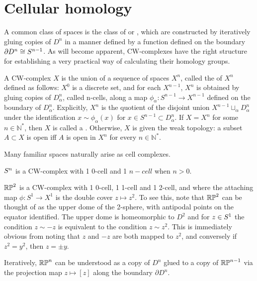 \section{Cellular homology}
A common class of spaces is the class of  or , which are constructed by iteratively gluing copies of $D^n$ in a manner defined by a function defined on the boundary $\partial D^n \iso \S{n-1}$. As will become apparent, CW-complexes have the right structure for establishing a very practical way of calculating their homology groups.

\begin{definition}
A CW-complex $X$ is the union of a sequence of spaces $X^n$, called the  of $X^n$ defined as follows: $X^0$ is a discrete set, and for each $X^{n-1}$, $X^{n}$ is obtained by gluing copies of $D_{\alpha}^n$, called n-cells, along a map $\phi_{\alpha}:S^{n-1}\rightarrow X^{n-1}$ defined on the boundary of $D_{\alpha}^n$. Explicitly, $X^n$ is the quotient of the disjoint union $X^{n-1}\sqcup_{\alpha} D_{\alpha}^n$ under the identification $x\sim \phi_{\alpha}(x)$ for $x\in S^{n-1}\subset D_{\alpha}^n$. If $X=X^n$ for some $n\in \mathbb{N}^*$, then $X$ is called a . Otherwise, $X$ is given the weak topology: a subset $A\subset X$ is open iff $A$ is open in $X^n$ for every $n\in \mathbb{N}^*$.
\end{definition}

Many familiar spaces naturally arise as cell complexes.

\begin{example}
$\S{n}$ is a CW-complex with 1 0-cell and 1 $n-cell$ when $n>0$. 
\end{example}

\begin{example}
$\RP{2}$ is a CW-complex with 1 0-cell, 1 1-cell and 1 2-cell, and where the attaching map $\phi:S^1\rightarrow X^1$ is the double cover $z\mapsto z^2$. To see this, note that $\RP{2}$ can be thought of as the upper dome of the 2-sphere, with antipodal points on the equator identified. The upper dome is homeomorphic to $D^2$ and for $z\in \S{1}$ the condition $z\sim -z$ is equivalent to the condition $z\sim z^2$. This is immediately obvious from noting that $z$ and $-z$ are both mapped to $z^2$, and conversely if $z^2=y^2$, then $z=\pm y$.

Iteratively, $\RP{n}$ can be understood as a copy of $D^n$ glued to a copy of $\RP{n-1}$ via the projection map $z\mapsto [z]$ along the boundary $\partial D^n$.
\end{example}

